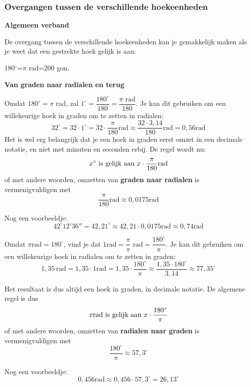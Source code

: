 \subsubsection{Overgangen tussen de verschillende hoekeenheden}

\textbf{Algemeen verband}

De overgang tussen de verschillende hoekeenheden kan je gemakkelijk maken als je weet dat een gestrekte hoek gelijk is aan:

\begin{onthoud}
180$^\circ$=$\pi$ rad=200 gon.
\end{onthoud}

\textbf{Van graden naar radialen en terug}

Omdat $180^\circ = \pi$ rad, zal $1^\circ=\dfrac{180^\circ}{180}=\dfrac{\pi \text{ rad}}{180}$. Je kan dit gebruiken om een willekeurige hoek in graden om te zetten in radialen:
\[32^\circ = 32\cdot 1^\circ = 32 \cdot \frac{\pi}{180} \text{rad}\approx \frac{32\cdot 3,14}{180}\text{rad}=0,56\text{rad}\]
Het is wel erg belangrijk dat je een hoek in graden eerst omzet in een decimale notatie, en niet met minuten en seconden erbij. De regel wordt nu:
\begin{equation*}
x^\circ \textup{ is gelijk aan } x\cdot \frac{\pi}{180} \text{rad}
\end{equation*}
of met andere woorden, omzetten van \textbf{graden naar radialen} is vermenigvuldigen met
\begin{equation*}
\dfrac{\pi}{180}\text{rad}\approx 0,0175\text{rad}
\end{equation*}

Nog een voorbeeldje:
\[42^\circ12'36''=42,21^\circ\approx 42,21 \cdot 0,0175 \text{rad}\approx 0,74 \text{rad}\]

Omdat $\pi \text{rad} = 180^\circ$, vind je dat $1 \text{rad} = \dfrac{\pi}{\pi} \text{  rad}=\dfrac{180^\circ}{\pi}$. Je kan dit gebruiken om een willekeurige hoek in radialen om te zetten in graden:
\[1,35~\text{rad} = 1,35 \cdot 1 \text{rad} = 1,35 \cdot \frac{180^\circ}{\pi}\approx \frac{1,35 \cdot 180^\circ}{3,14}\approx 77,35^\circ\]

Het resultaat is dus altijd een hoek in graden, in decimale notatie.  De algemene regel is dus
\[x \text{rad} \textup{ is gelijk aan } x\cdot \frac{180^\circ}{\pi}\]
of met andere woorden, omzetten van \textbf{radialen naar graden} is vermenigvuldigen met
\[
\frac{180^\circ}{\pi} \approx 57,3^\circ
\]

Nog een voorbeeldje:
\[0,456 \text{rad} \approx 0,456 \cdot 57,3^\circ = 26,13^\circ\]

